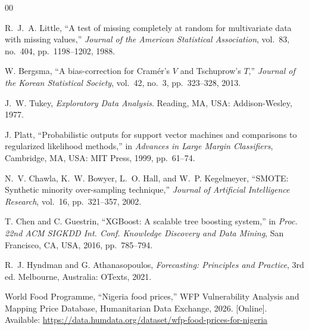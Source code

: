 \documentclass[conference]{IEEEtran}
\begin{document}
\begin{thebibliography}{00}

 R.~J.~A. Little, ``A test of missing completely at random
for multivariate data with missing values,'' \emph{Journal of the American
Statistical Association}, vol.~83, no.~404, pp.~1198--1202, 1988.

 W. Bergsma, ``A bias-correction for Cram\'{e}r's $V$ and
Tschuprow's $T$,'' \emph{Journal of the Korean Statistical Society}, vol.~42,
no.~3, pp.~323--328, 2013.

 J.~W. Tukey, \emph{Exploratory Data Analysis}. Reading,
MA, USA: Addison-Wesley, 1977.

 J. Platt, ``Probabilistic outputs for support vector
machines and comparisons to regularized likelihood methods,'' in
\emph{Advances in Large Margin Classifiers}, Cambridge, MA, USA: MIT Press,
1999, pp.~61--74.

 N.~V. Chawla, K.~W. Bowyer, L.~O. Hall, and W.~P.
Kegelmeyer, ``SMOTE: Synthetic minority over-sampling technique,''
\emph{Journal of Artificial Intelligence Research}, vol.~16, pp.~321--357,
2002.

 T. Chen and C. Guestrin, ``XGBoost: A scalable tree
boosting system,'' in \emph{Proc. 22nd ACM SIGKDD Int. Conf. Knowledge
Discovery and Data Mining}, San Francisco, CA, USA, 2016, pp.~785--794.

 R.~J. Hyndman and G. Athanasopoulos,
\emph{Forecasting: Principles and Practice}, 3rd ed. Melbourne, Australia:
OTexts, 2021.

 World Food Programme, ``Nigeria food prices,'' WFP
Vulnerability Analysis and Mapping Price Database, Humanitarian Data Exchange,
2026. [Online]. Available:
\url{https://data.humdata.org/dataset/wfp-food-prices-for-nigeria}

\end{thebibliography}
\end{document}
